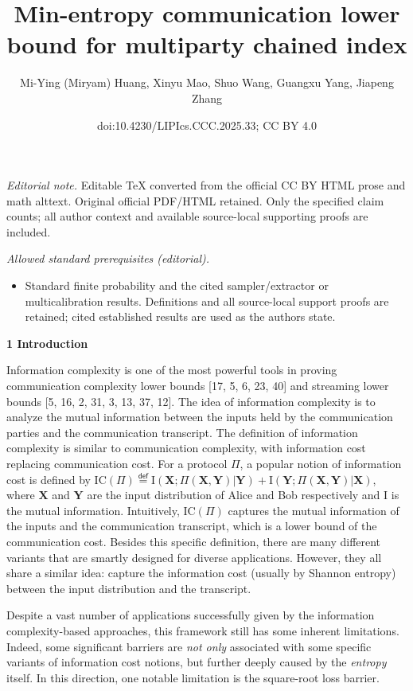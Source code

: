 \documentclass[10pt,a4paper]{article}
\title{Min-entropy communication lower bound for multiparty chained index}
\author{Mi-Ying (Miryam) Huang, Xinyu Mao, Shuo Wang, Guangxu Yang, Jiapeng Zhang}
\date{doi:10.4230/LIPIcs.CCC.2025.33; CC BY 4.0}
\begin{document}
\maketitle
\noindent\textit{Editorial note.} Editable TeX converted from the official CC BY HTML prose and math alttext. Original official PDF/HTML retained. Only the specified claim counts; all author context and available source-local supporting proofs are included.\par\medskip
\noindent\textit{Allowed standard prerequisites (editorial).}\begin{itemize}
\item Standard finite probability and the cited sampler/extractor or multicalibration results. Definitions and all source-local support proofs are retained; cited established results are used as the authors state.
\end{itemize}\medskip


\par\medskip\noindent\textbf{
1 Introduction}\par




Information complexity is one of the most powerful tools in proving communication complexity lower bounds [17, 5, 6, 23, 40] and streaming lower bounds [5, 16, 2, 31, 3, 13, 37, 12]. The idea of information complexity is to analyze the mutual information between the inputs held by the communication parties and the communication transcript. The definition of information complexity is similar to communication complexity, with information cost replacing communication cost. For a protocol $\Pi$, a popular notion of information cost is defined by
$\text{IC}(\Pi)\stackrel{{\scriptstyle\mathsf{def}}}{{=}}\text{I}(\bm{X};\Pi(\bm{X},\bm{Y})|\bm{Y})+\text{I}(\bm{Y};\Pi(\bm{X},\bm{Y})|\bm{X})$, where $\bm{X}$ and $\bm{Y}$ are the input distribution of Alice and Bob respectively and I is the mutual information. Intuitively, $\text{IC}(\Pi)$ captures the mutual information of the inputs and the communication transcript, which is a lower bound of the communication cost. Besides this specific definition, there are many different variants that are smartly designed for diverse applications. However, they all share a similar idea: capture the information cost (usually by Shannon entropy) between the input distribution and the transcript.\par




Despite a vast number of applications successfully given by the information complexity-based approaches, this framework still has some inherent limitations. Indeed, some significant barriers are \emph{not only} associated with some specific variants of information cost notions, but further deeply caused by the \emph{entropy} itself. In this direction, one notable limitation is the square-root loss barrier.\par
\end{document}

